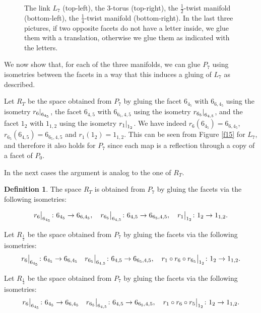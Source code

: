 \documentclass{amsart}
\theoremstyle{definition}
\newtheorem{defn}[lemma]{Definition}
\theoremstyle{remark}
\newcommand\restr[2]{{%
  \left.\kern-\nulldelimiterspace %
  #1 %
  \littletaller %
  \right|_{#2} %
  }}
\newcommand{\littletaller}{\mathchoice{\vphantom{\big|}}{}{}{}}
\begin{document}
\begin{figure}

    \caption{The link $L_7$ (top-left), the $3$-torus (top-right), the $\frac{1}{2}$-twist manifold (bottom-left), the $\frac{1}{4}$-twist manifold (bottom-right). In the last three pictures, if two opposite facets do not have  a letter inside, we glue them with a translation, otherwise we glue them as indicated with the letters.}\label{f14}
\end{figure}

We now show that, for each of the three manifolds, we can glue $P_7$ using isometries between the facets in a way that this induces a gluing of $L_7$ as described.

Let $R_T$ be the space obtained from $P_7$ by gluing the facet $6_{4_5}$ with $6_{6,4_5}$ using the isometry $\restr{r_6}{6_{4_5}}$, the facet $6_{4,5}$ with $6_{6_5,4,5}$ using the isometry $\restr{r_{6_5}}{6_{4,5}}$, and the facet $1_2$ with $1_{1,2}$ using the isometry $\restr{r_1}{1_2}$. We have indeed $r_6(6_{4_5})  = 6_{6,4_5}$, $r_{6_5}(6_{4,5}) = 6_{6_5,4,5}$ and $r_1(1_2) = 1_{1,2}$. This can be seen from Figure \ref{f15} for $L_7$, and therefore it also holds for $P_7$ since each map is a reflection through a copy of a facet of $P_0$.

In the next cases the argument is analog to the one of $R_T$.

\begin{defn}
The space $R_T$ is obtained from $P_7$ by gluing the facets via the following isometries:

$$
\restr{r_6}{6_{4_5}}\colon 6_{4_5}\rightarrow 6_{6,4_5}, \quad \restr{r_{6_5}}{6_{4,5}}\colon 6_{4,5}\rightarrow 6_{6_5,4,5}, \quad \restr{r_1}{1_2}\colon 1_2\rightarrow 1_{1,2}.
$$  

Let $R_{\frac{1}{2}}$ be the space obtained from $P_7$ by gluing the facets via the following isometries:
$$
\restr{r_6}{6_{4_5}}\colon 6_{4_5}\rightarrow 6_{6,4_5}\quad \restr{r_{6_5}}{6_{4,5}}\colon 6_{4,5}\rightarrow 6_{6_5,4,5}, \quad \restr{r_1\circ r_6 \circ r_{6_5}}{1_2}\colon 1_2\rightarrow 1_{1,2}.
$$

Let $R_{\frac{1}{4}}$ be the space obtained from $P_7$ by gluing the facets via the following isometries:
$$
\restr{r_6}{6_{4_5}}\colon 6_{4_5}\rightarrow 6_{6,4_5}\quad \restr{r_{6_5}}{6_{4,5}}\colon 6_{4,5}\rightarrow 6_{6_5,4,5}, \quad \restr{r_1\circ r_6 \circ r_5}{1_2}\colon 1_2\rightarrow 1_{1,2}.
$$
\end{defn}
\end{document}
